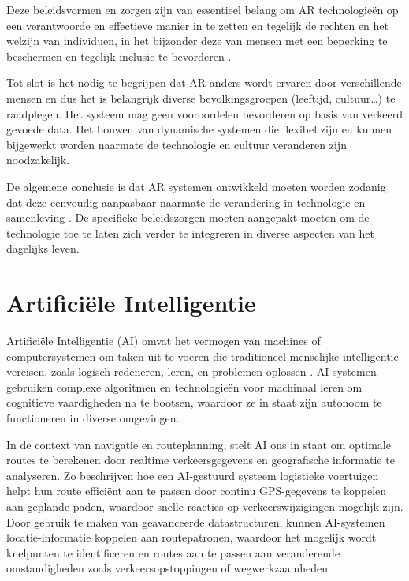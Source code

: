 Deze beleidsvormen en zorgen zijn van essentieel belang om AR technologieën op een verantwoorde en effectieve manier in te zetten en tegelijk de rechten en het welzijn van individuen, in het bijzonder deze van mensen met een beperking te beschermen en tegelijk inclusie te bevorderen \autocite{Roesner2014}.

Tot slot is het nodig te begrijpen dat AR anders wordt ervaren door verschillende mensen en dus het is belangrijk diverse bevolkingsgroepen (leeftijd, cultuur\ldots) te raadplegen. Het systeem mag geen vooroordelen bevorderen op basis van verkeerd gevoede data. Het bouwen van dynamische systemen die flexibel zijn en kunnen bijgewerkt worden naarmate de technologie en cultuur veranderen zijn noodzakelijk. 

De algemene conclusie is dat AR systemen ontwikkeld moeten worden zodanig dat deze eenvoudig aanpasbaar naarmate de verandering in technologie en samenleving \autocite{Calo2015}.  De specifieke beleidszorgen moeten aangepakt moeten om de technologie toe te laten zich verder te integreren in diverse aspecten van het dagelijks leven.




\section{Artificiële Intelligentie}
\label{sec:artificiele-intelligentie}

Artificiële Intelligentie (AI) omvat het vermogen van machines of computersystemen om taken uit te voeren die traditioneel menselijke intelligentie vereisen, zoals logisch redeneren, leren, en problemen oplossen \autocite{Sabouret2020}. AI-systemen gebruiken complexe algoritmen en technologieën voor machinaal leren om cognitieve vaardigheden na te bootsen, waardoor ze in staat zijn autonoom te functioneren in diverse omgevingen. 

In de context van navigatie en routeplanning, stelt AI ons in staat om optimale routes te berekenen door realtime verkeersgegevens en geografische informatie te analyseren. Zo beschrijven \textcite{Hu2020} hoe een AI-gestuurd systeem logistieke voertuigen helpt hun route efficiënt aan te passen door continu GPS-gegevens te koppelen aan geplande paden, waardoor snelle reacties op verkeerswijzigingen mogelijk zijn. Door gebruik te maken van geavanceerde datastructuren, kunnen AI-systemen locatie-informatie koppelen aan routepatronen, waardoor het mogelijk wordt knelpunten te identificeren en routes aan te passen aan veranderende omstandigheden zoals verkeersopstoppingen of wegwerkzaamheden \autocite{Soni2023a,Ruta2010}. 

